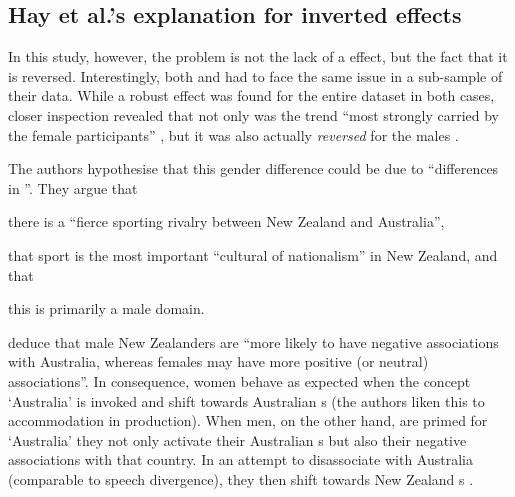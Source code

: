 		\subsection{Hay et al.'s explanation for inverted effects}

In this study, however, the problem is not the lack of a  effect, but the fact that it is reversed.
Interestingly, both \textcite{hayetal2006a} and \textcite{haydrager2010} had to face the same issue in a sub-sample of their data.
While a robust  effect was found for the entire dataset in both cases, closer inspection revealed that not only was the trend ``most strongly carried by the female participants'' \parencite[875]{haydrager2010}, but it was also actually \emph{reversed} for the males \parencite[cf.][876--877]{haydrager2010}.

The authors hypothesise that this gender difference could be due to ``differences in ''.
They argue that
	\begin{inparaenum}[(a)]
		\item there is a ``fierce sporting rivalry between New Zealand and Australia'',
		\item that sport is the most important ``cultural  of nationalism'' in New Zealand, and that
		\item this is primarily a male domain.
	\end{inparaenum}
\citeauthor{haydrager2010} deduce that male New Zealanders are ``more likely to have negative associations with Australia, whereas females may have more positive (or neutral) associations''.
In consequence, women behave as expected when the concept `Australia' is invoked and shift towards Australian s (the authors liken this to accommodation in production).
When men, on the other hand, are primed for `Australia' they not only activate their Australian s but also their negative associations with that country.
In an attempt to disassociate with Australia (comparable to speech divergence), they then shift towards New Zealand s \parencite[cf.][884--885]{haydrager2010}.


